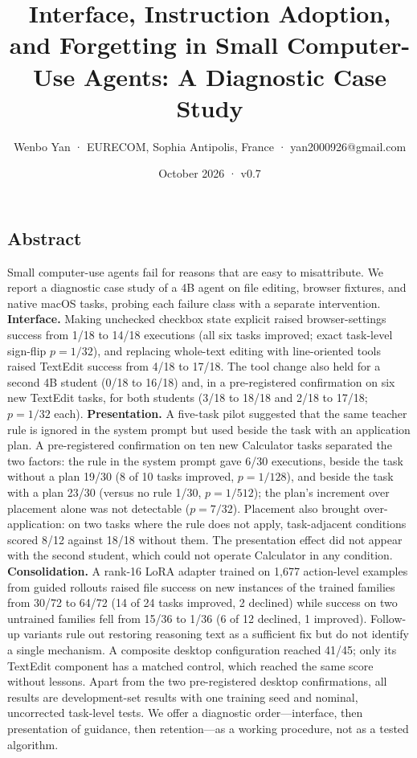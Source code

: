 \documentclass[
  10pt,
]{article}
\title{Interface, Instruction Adoption, and Forgetting in Small
Computer-Use Agents: A Diagnostic Case Study}
\author{Wenbo Yan · EURECOM, Sophia Antipolis, France ·
yan2000926@gmail.com}
\date{October 2026 · v0.7}
\begin{document}
\maketitle

\subsection{Abstract}\label{abstract}

Small computer-use agents fail for reasons that are easy to
misattribute. We report a diagnostic case study of a 4B agent on file
editing, browser fixtures, and native macOS tasks, probing each failure
class with a separate intervention. \textbf{Interface.} Making unchecked
checkbox state explicit raised browser-settings success from 1/18 to
14/18 executions (all six tasks improved; exact task-level sign-flip
\(p=1/32\)), and replacing whole-text editing with line-oriented tools
raised TextEdit success from 4/18 to 17/18. The tool change also held
for a second 4B student (0/18 to 16/18) and, in a pre-registered
confirmation on six new TextEdit tasks, for both students (3/18 to 18/18
and 2/18 to 17/18; \(p=1/32\) each). \textbf{Presentation.} A five-task
pilot suggested that the same teacher rule is ignored in the system
prompt but used beside the task with an application plan. A
pre-registered confirmation on ten new Calculator tasks separated the
two factors: the rule in the system prompt gave 6/30 executions, beside
the task without a plan 19/30 (8 of 10 tasks improved, \(p=1/128\)), and
beside the task with a plan 23/30 (versus no rule 1/30, \(p=1/512\));
the plan's increment over placement alone was not detectable
(\(p=7/32\)). Placement also brought over-application: on two tasks
where the rule does not apply, task-adjacent conditions scored 8/12
against 18/18 without them. The presentation effect did not appear with
the second student, which could not operate Calculator in any condition.
\textbf{Consolidation.} A rank-16 LoRA adapter trained on 1,677
action-level examples from guided rollouts raised file success on new
instances of the trained families from 30/72 to 64/72 (14 of 24 tasks
improved, 2 declined) while success on two untrained families fell from
15/36 to 1/36 (6 of 12 declined, 1 improved). Follow-up variants rule
out restoring reasoning text as a sufficient fix but do not identify a
single mechanism. A composite desktop configuration reached 41/45; only
its TextEdit component has a matched control, which reached the same
score without lessons. Apart from the two pre-registered desktop
confirmations, all results are development-set results with one training
seed and nominal, uncorrected task-level tests. We offer a diagnostic
order---interface, then presentation of guidance, then retention---as a
working procedure, not as a tested algorithm.
\end{document}
